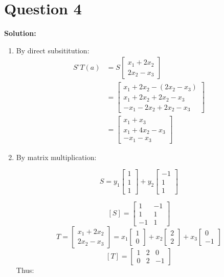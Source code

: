 \documentclass[11pt]{article} %
\begin{document}
\section{Question 4}
\textbf{Solution:}

\begin{enumerate}
	\item By direct subsititution:
	\begin{align*}
		S^\circ T(a)&=S\begin{bmatrix}
			x_1+2x_2\\
			2x_2-x_3
		\end{bmatrix}\\
	&=\begin{bmatrix}
		x_1+2x_2-(2x_2-x_3)\\
		x_1+2x_2+2x_2-x_3\\
		-x_1-2x_2+2x_2-x_3
	\end{bmatrix}\\
&=\begin{bmatrix}
	x_1+x_3\\
	x_1+4x_2-x_3\\
	-x_1-x_3
\end{bmatrix}
	\end{align*}

\item By matrix multiplication:

$$S=y_1\begin{bmatrix}
	1\\
	1\\
	1
\end{bmatrix}+y_2\begin{bmatrix}
-1\\
1\\
1
\end{bmatrix}$$

$$ [S ]=\begin{bmatrix}
	1&-1\\
	1&1\\
	-1&1
\end{bmatrix}
$$
$$T=\begin{bmatrix}
	x_1+2x_2\\
	2x_2-x_3
\end{bmatrix}=x_1\begin{bmatrix}
1\\
0
\end{bmatrix}+x_2\begin{bmatrix}
2\\
2
\end{bmatrix}+x_3\begin{bmatrix}
0\\-1
\end{bmatrix}$$
$$[T]=\begin{bmatrix}
	1&2&0\\
	0&2&-1
\end{bmatrix}$$
Thus:


\end{enumerate}
\end{document}
